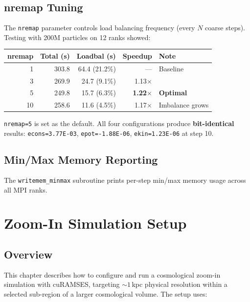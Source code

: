 \documentclass[11pt,fleqn]{book}
\begin{document}
\section{nremap Tuning}

The \texttt{nremap} parameter controls load balancing frequency (every $N$ coarse steps). Testing with 200M particles on 12 ranks showed:

\begin{center}
\begin{tabular}{rrrrl}
\toprule
\textbf{nremap} & \textbf{Total (s)} & \textbf{Loadbal (s)} & \textbf{Speedup} & \textbf{Note} \\
\midrule
1 & 303.8 & 64.4 (21.2\%) & --- & Baseline \\
3 & 269.9 & 24.7 (9.1\%) & 1.13$\times$ & \\
5 & 249.8 & 15.7 (6.3\%) & \textbf{1.22$\times$} & \textbf{Optimal} \\
10 & 258.6 & 11.6 (4.5\%) & 1.17$\times$ & Imbalance grows \\
\bottomrule
\end{tabular}
\end{center}

\begin{infobox}
\texttt{nremap=5} is set as the default. All four configurations produce \textbf{bit-identical} results: \texttt{econs=3.77E-03}, \texttt{epot=-1.88E-06}, \texttt{ekin=1.23E-06} at step 10.
\end{infobox}

\section{Min/Max Memory Reporting}

The \texttt{writemem\_minmax} subroutine prints per-step min/max memory usage across all MPI ranks.


\chapter{Zoom-In Simulation Setup}
\label{ch:zoomin}

\section{Overview}

This chapter describes how to configure and run a cosmological zoom-in simulation with cuRAMSES, targeting ${\sim}1$\,kpc physical resolution within a selected sub-region of a larger cosmological volume. The setup uses:
\end{document}
